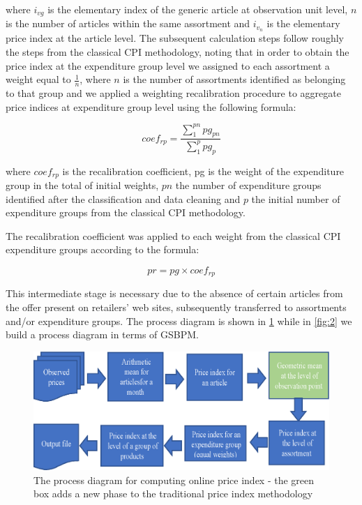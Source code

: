 \documentclass[]{article}
\begin{document}
where $i_{vg}$ is the elementary index of the generic article at observation unit level, $n$ is the number of 
articles within the same assortment and $i_{v_{n}}$ is the elementary price index at the article level. 
The subsequent calculation steps follow roughly the steps from the classical CPI methodology, noting that in order 
to obtain the price index at the expenditure group level we assigned to each assortment a weight equal to $\frac{1}{n}$,
where $n$ is the number of assortments identified as belonging to that group and we applied a weighting 
recalibration procedure to aggregate price indices at expenditure group level using the following formula:


\begin{equation}\label{eq:4}
coef_{rp} = \frac{\sum_1^{pn}{pg_{pn}}}{\sum_1^p{pg_{p}}}
\end{equation}


where $coef_{rp}$  is the recalibration coefficient, pg is the weight of the expenditure group in the total of 
initial weights, $pn$ the number of expenditure groups identified after the classification and data cleaning 
and $p$ the initial number of expenditure groups from the classical CPI methodology.


The recalibration coefficient was applied to each weight from the classical CPI expenditure groups according to the formula:


\begin{equation}\label{eq:3}
pr = pg \times coef_{rp}
\end{equation}


This intermediate stage is necessary due to the absence of certain articles from the offer present on retailers' web sites, subsequently transferred to assortments and/or expenditure groups.
The process diagram is shown in \ref{fig:1} while in \ref{fig:2} we build a process diagram in terms of GSBPM.


\begin{figure}
\centering
\includegraphics[width=0.7\linewidth]{fig1.eps}
\caption{The process diagram for computing online price index - the green box adds a new phase to the traditional price index methodology}
\label{fig:1}
\end{figure}
\end{document}
